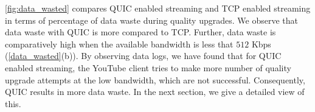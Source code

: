 \fig\ref{fig:data_wasted} compares QUIC enabled streaming and TCP enabled streaming in terms of percentage of data waste during quality upgrades. 
We observe that data waste with QUIC is more compared to TCP. Further, data waste is comparatively high when the available bandwidth is less that $512$ Kbps (\fig\ref{data_wasted}(b)). 
By observing data logs, we have found that for QUIC enabled streaming, the YouTube client tries to make more number of quality upgrade attempts at the low bandwidth, which are not successful. 
Consequently, QUIC results in more data waste. In the next section, we give a detailed view of this. 


